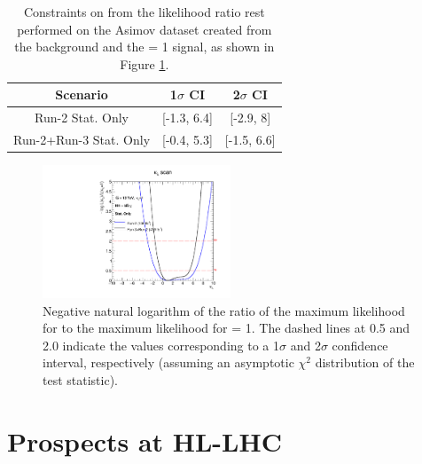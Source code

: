 \begin{table}[htbp]
    \centering
    \begin{tabular}{ccc}
    \hline\hline 
        Scenario & 1$\sigma$ CI & 2$\sigma$ CI \\
    \hline    
        Run-2 Stat. Only & [-1.3, 6.4]  & [-2.9, 8] \\
        Run-2+Run-3 Stat. Only & [-0.4, 5.3] & [-1.5, 6.6] \\
    \hline\hline 
    \end{tabular}
    \begin{tcolorbox}[colback=black!5!white, colframe=white!75!black]
    \caption{Constraints on \kl from the likelihood ratio rest performed on the Asimov dataset created from the background and the \kl= 1 signal, as shown in Figure \ref{fig:Run-3:LH}.}
    \label{tab:Run-3:kl}
    \end{tcolorbox}
\end{table}

\begin{figure}[htbp]
    \centering
    \includegraphics[width=0.5\textwidth]{Ch6/Img/likelihood_subplot_Run3.pdf}
    \begin{tcolorbox}[colback=black!5!white, colframe=white!75!black]
    \caption{Negative natural logarithm of the ratio of the maximum likelihood for \kl to the maximum likelihood for \kl= 1. The dashed lines at 0.5 and 2.0 indicate the values corresponding to a 1$\sigma$ and 2$\sigma$ confidence interval, respectively (assuming an asymptotic $\chi^2$ distribution of the test statistic).}
    \label{fig:Run-3:LH}
    \end{tcolorbox}
\end{figure}

\section{Prospects at HL-LHC}
\label{HL-LHC:HL-LHC}

